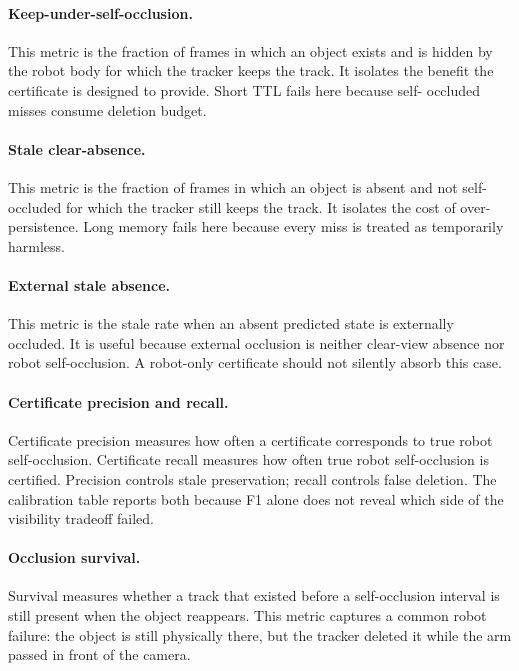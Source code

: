\documentclass{article}
\begin{document}
\paragraph{Keep-under-self-occlusion.}
This metric is the fraction of frames in which an object exists and is hidden by
the robot body for which the tracker keeps the track. It isolates the benefit
the certificate is designed to provide. Short TTL fails here because self-
occluded misses consume deletion budget.

\paragraph{Stale clear-absence.}
This metric is the fraction of frames in which an object is absent and not
self-occluded for which the tracker still keeps the track. It isolates the cost
of over-persistence. Long memory fails here because every miss is treated as
temporarily harmless.

\paragraph{External stale absence.}
This metric is the stale rate when an absent predicted state is externally
occluded. It is useful because external occlusion is neither clear-view absence
nor robot self-occlusion. A robot-only certificate should not silently absorb
this case.

\paragraph{Certificate precision and recall.}
Certificate precision measures how often a certificate corresponds to true
robot self-occlusion. Certificate recall measures how often true robot
self-occlusion is certified. Precision controls stale preservation; recall
controls false deletion. The calibration table reports both because F1 alone
does not reveal which side of the visibility tradeoff failed.

\paragraph{Occlusion survival.}
Survival measures whether a track that existed before a self-occlusion interval
is still present when the object reappears. This metric captures a common robot
failure: the object is still physically there, but the tracker deleted it while
the arm passed in front of the camera.
\end{document}
